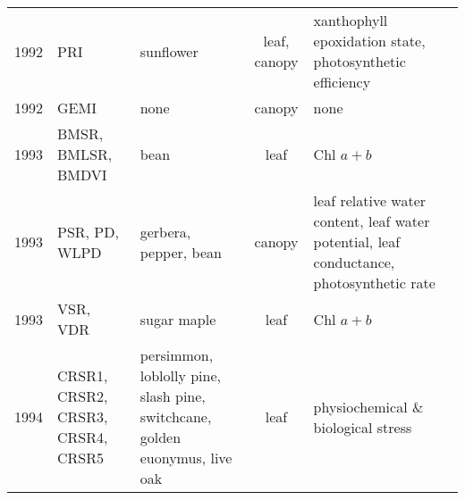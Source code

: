 \documentclass[10pt]{article}
\begin{document}
{\begin{ThreePartTable}
\begin{longtable}{c M{1.5in} M{2.5in} c M{1.5in} M{1.5in}}
  1992 & PRI                                             & sunflower                                                                                                                                                                                                                                             & leaf, canopy & xanthophyll epoxidation state, photosynthetic efficiency                                 & \citet{Gamon1992}                                   \\
  1992 & GEMI                                            & none                                                                                                                                                                                                                                                  & canopy       & none                                                                                     & \citet{Pinty1992}                                   \\
  1993 & BMSR, BMLSR, BMDVI                              & bean                                                                                                                                                                                                                                                  & leaf         & Chl $a+b$                                                                                & \citet{Buschmann1993}                               \\
  1993 & PSR, PD, WLPD                                   & gerbera, pepper, bean                                                                                                                                                                                                                                 & canopy       & leaf relative water content, leaf water potential, leaf conductance, photosynthetic rate & \citet{Penuelas1993}                                \\
  1993 & VSR, VDR                                        & sugar maple                                                                                                                                                                                                                                           & leaf         & Chl $a+b$                                                                                & \citet{Vogelmann1993}                               \\
  1994 & CRSR1, CRSR2, CRSR3, CRSR4, CRSR5               & persimmon, loblolly pine, slash pine, switchcane, golden euonymus, live oak                                                                                                                                                                           & leaf         & physiochemical \& biological stress                                                      & \citet{Carter1994}                                  \\

\end{longtable}
\end{ThreePartTable}}
\end{document}
